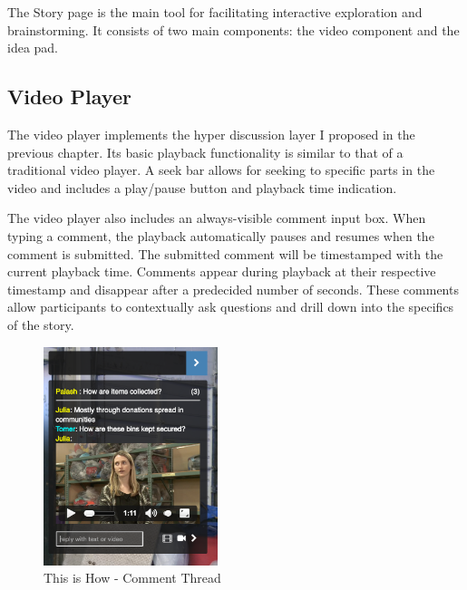 The Story page is the main tool for facilitating interactive exploration and brainstorming. It consists of two main components: the video component and the idea pad.

\subsection{Video Player}

The video player implements the hyper discussion layer I proposed in the previous chapter. Its basic playback functionality is similar to that of a traditional video player. A seek bar allows for seeking to specific parts in the video and includes a play/pause button and playback time indication.

The video player also includes an always-visible comment input box. When typing a comment, the playback automatically pauses and resumes when the comment is submitted. The submitted comment will be timestamped with the current playback time. Comments appear during playback at their respective timestamp and disappear after a predecided number of seconds. These comments allow participants to contextually ask questions and drill down into the specifics of the story.  

   \begin{figure}[thpb]
      \centering
      \includegraphics[width=2in]{figures/commentthread.png}
      \caption{This is How - Comment Thread}
      \label{fig_comment_thread}
   \end{figure}

